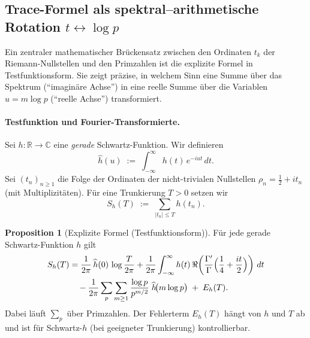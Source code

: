 \documentclass[11pt,twocolumn,a4paper]{article}
\theoremstyle{definition}
\newtheorem{proposition}{Proposition}[section]
\begin{document}
\subsection{Trace-Formel als spektral--arithmetische Rotation $t \leftrightarrow \log p$}
\label{sec:trace_formula}
Ein zentraler mathematischer Brückensatz zwischen den Ordinaten $t_k$ der Riemann-Nullstellen
und den Primzahlen ist die explizite Formel in Testfunktionsform. Sie zeigt präzise,
in welchem Sinn eine Summe über das Spektrum (``imaginäre Achse'') in eine reelle Summe
über die Variablen $u=m\log p$ (``reelle Achse'') transformiert.

\paragraph{Testfunktion und Fourier-Transformierte.}
Sei $h:\mathbb{R}\to\mathbb{C}$ eine \emph{gerade} Schwartz-Funktion. Wir definieren
\[
\widehat h(u)\;:=\;\int_{-\infty}^{\infty} h(t)\,e^{-iut}\,dt.
\]
Sei $(t_n)_{n\ge 1}$ die Folge der Ordinaten der nicht-trivialen Nullstellen
$\rho_n=\tfrac12+it_n$ (mit Multiplizitäten). Für eine Trunkierung $T>0$ setzen wir
\[
S_h(T)\;:=\;\sum_{|t_n|\le T} h(t_n).
\]

\begin{proposition}[Explizite Formel (Testfunktionsform)]
\label{prop:explicit_QZG}
Für jede gerade Schwartz-Funktion $h$ gilt
\begin{align}
S_h(T)
&=\frac{1}{2\pi}\,\widehat h(0)\,\log\frac{T}{2\pi}
+\frac{1}{2\pi}\int_{-\infty}^{\infty} h(t)\,
\Re\!\left(\frac{\Gamma'}{\Gamma}\Bigl(\frac14+\frac{it}{2}\Bigr)\right)\,dt \notag\\
&\quad-\frac{1}{2\pi}\sum_{p}\sum_{m\ge 1}\frac{\log p}{p^{m/2}}\;\widehat h\!\bigl(m\log p\bigr)
\;+\;E_h(T).
\label{eq:explicit_QZG}
\end{align}
Dabei läuft $\sum_p$ über Primzahlen. Der Fehlerterm $E_h(T)$ hängt von $h$ und $T$ ab und ist
für Schwartz-$h$ (bei geeigneter Trunkierung) kontrollierbar.
\end{proposition}
\end{document}
